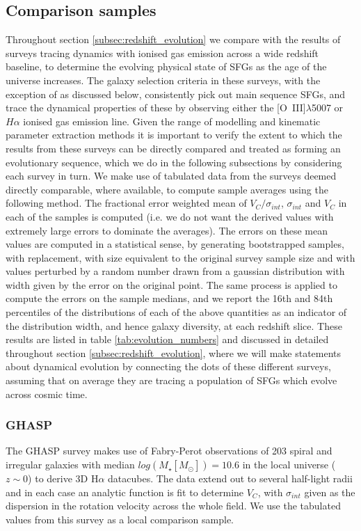 \documentclass[fleqn,usenatbib]{mn2e}
\begin{document}
\subsection{Comparison samples}\label{subsubsec:comparison_samples}
Throughout section \cref{subsec:redshift_evolution} we compare with the results of surveys tracing dynamics with ionised gas emission across a wide redshift baseline, to determine the evolving physical state of SFGs as the age of the universe increases.
The galaxy selection criteria in these surveys, with the exception of \cite{Green2014} as discussed below, consistently pick out main sequence SFGs, and trace the dynamical properties of these by observing either the [O~{\sc III}]$\lambda$5007 or $H\alpha$ ionised gas emission line.
Given the range of modelling and kinematic parameter extraction methods it is important to verify the extent to which the results from these surveys can be directly compared and treated as forming an evolutionary sequence, which we do in the following subsections by considering each survey in turn.
We make use of tabulated data from the surveys deemed directly comparable, where available, to compute sample averages using the following method. 
The fractional error weighted mean of $V_{C}/\sigma_{int}$, $\sigma_{int}$ and $V_{C}$ in each of the samples is computed (i.e. we do not want the derived values with extremely large errors to dominate the averages).
The errors on these mean values are computed in a statistical sense, by generating bootstrapped samples, with replacement, with size equivalent to the original survey sample size and with values perturbed by a random number drawn from a gaussian distribution with width given by the error on the original point.
The same process is applied to compute the errors on the sample medians, and we report the 16th and 84th percentiles of the distributions of each of the above quantities as an indicator of the distribution width, and hence galaxy diversity, at each redshift slice.
These results are listed in table \ref{tab:evolution_numbers} and discussed in detailed throughout section \cref{subsec:redshift_evolution}, where we will make statements about dynamical evolution by connecting the dots of these different surveys, assuming that on average they are tracing a population of SFGs which evolve across cosmic time. 

\subsubsection{GHASP}\label{subsubsec:GHASP}
The GHASP survey \citep[E08]{Epinat2008a,Epinat2008} makes use of Fabry-Perot observations of 203 spiral and irregular galaxies with median $log(M_{\star}[M_{\odot}])=10.6$ in the local universe ($z\sim0$) to derive 3D H$\alpha$ datacubes.
The data extend out to several half-light radii and in each case an analytic function is fit to determine $V_{C}$, with $\sigma_{int}$ given as the dispersion in the rotation velocity across the whole field.
We use the tabulated values from this survey as a local comparison sample.
\end{document}
